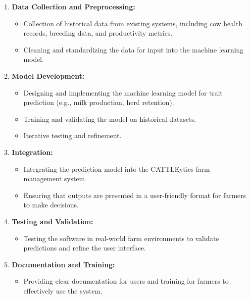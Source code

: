 \documentclass[12pt]{article}
\begin{document}
\begin{enumerate}
    \item \textbf{Data Collection and Preprocessing:}
    \begin{itemize}
        \item Collection of historical data from existing systems, including 
        cow health records, breeding data, and productivity metrics.
        \item Cleaning and standardizing the data for input into the machine 
        learning model.
    \end{itemize}

    \item \textbf{Model Development:}
    \begin{itemize}
        \item Designing and implementing the machine learning model for trait 
        prediction (e.g., milk production, herd retention).
        \item Training and validating the model on historical datasets.
        \item Iterative testing and refinement.
    \end{itemize}

    \item \textbf{Integration:}
    \begin{itemize}
        \item Integrating the prediction model into the CATTLEytics farm 
        management system.
        \item Ensuring that outputs are presented in a user-friendly format 
        for farmers to make decisions.
    \end{itemize}

    \item \textbf{Testing and Validation:}
    \begin{itemize}
        \item Testing the software in real-world farm environments to validate 
        predictions and refine the user interface.
    \end{itemize}

    \item \textbf{Documentation and Training:}
    \begin{itemize}
        \item Providing clear documentation for users and training for farmers 
        to effectively use the system.
    \end{itemize}
\end{enumerate}
\end{document}
